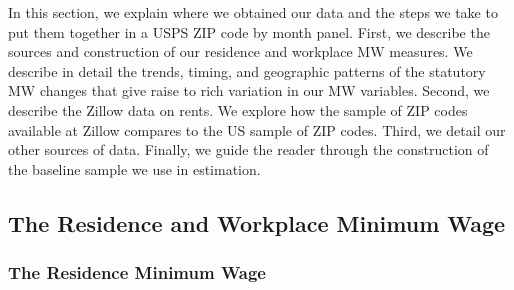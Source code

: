 
In this section, we explain where we obtained our data and the steps we take to 
put them together in a USPS ZIP code by month panel.
First, we describe the sources and construction of our residence and workplace 
MW measures.
We describe in detail the trends, timing, and geographic patterns of the 
statutory MW changes that give raise to rich variation in our MW variables.
Second, we describe the Zillow data on rents.
We explore how the sample of ZIP codes available at Zillow compares to the US 
sample of ZIP codes.
Third, we detail our other sources of data.
Finally, we guide the reader through the construction of the baseline sample we
use in estimation.

\subsection{The Residence and Workplace Minimum Wage}\label{sec:mw_construction}

\subsubsection{The Residence Minimum Wage}\label{data_res_mw}

